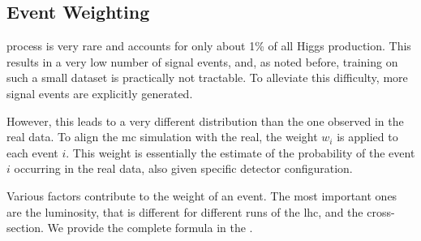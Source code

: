 \subsection{Event Weighting}

\tth process is very rare and accounts for only about 1\% of all Higgs production. This results in a very low number of
signal events, and, as noted before, training on such a small dataset is practically not tractable. To alleviate this
difficulty, more signal events are explicitly generated.

However, this leads to a very different distribution than the one observed in the real data. To align the \gls{mc}
simulation with the real, the weight $w_i$ is applied to each event $i$. This weight is essentially the estimate of the
probability of the event $i$ occurring in the real data, also given specific detector configuration.

Various factors contribute to the weight of an event. The most important ones are the luminosity, that is different for
different runs of the \gls{lhc}, and the cross-section. We provide the complete formula in the
.
